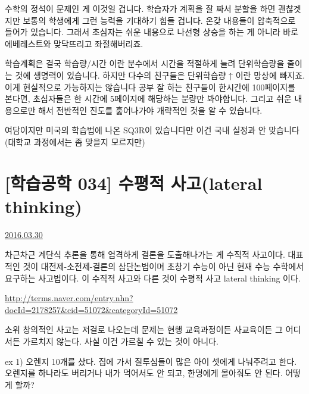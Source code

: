 수학의 정석이 문제인 게 이것일 겁니다.
학습자가 계획을 잘 짜서 분할을 하면 괜찮겟지만 보통의 학생에게 그런 능력을 기대하기 힘들 겁니다.
온갖 내용들이 압축적으로 들어가 있습니다. 그래서 초심자는 쉬운 내용으로 나선형 상승을 하는 게 아니라
바로 에베레스트와 맞닥뜨리고 좌절해버리죠.
\vspace{5mm}

학습계획은 결국 학습량/시간 이란 분수에서 시간을 적절하게 늘려 단위학습량을 줄이는 것에 생명력이 있습니다.
하지만 다수의 친구들은 단위학습량 ↑ 이란 망상에 빠지죠. 이게 현실적으로 가능하지는 않습니다
공부 잘 하는 친구들이 한시간에 100페이지를 본다면, 초심자들은 한 시간에 5페이지에 해당하는 분량만 봐야합니다.
그리고 쉬운 내용으로만 해서 전반적인 진도를 훑어나가야 개략적인 것을 알 수 있습니다.
\vspace{5mm}

여담이지만 미국의 학습법에 나온 SQ3R이 있습니다만 이건 국내 실정과 안 맞습니다(대학교 과정에서는 좀 맞을지 모르지만)
\vspace{5mm}











\section{[학습공학 034] 수평적 사고(lateral thinking)}
\href{https://www.kockoc.com/Apoc/702963}{2016.03.30}

\vspace{5mm}

차근차근 계단식 추론을 통해 엄격하게 결론을 도출해나가는 게 수직적 사고이다.
대표적인 것이 대전제-소전제-결론의 삼단논법이며 초창기 수능이 아닌 현재 수능 수학에서 요구하는 사고법이다.
이 수직적 사고와 다른 것이 수평적 사고 lateral thinking 이다.
\vspace{5mm}

\url{http://terms.naver.com/entry.nhn?docId=2178257&cid=51072&categoryId=51072}
\vspace{5mm}

소위 창의적인 사고는 저걸로 나오는데 문제는 현행 교육과정이든 사교육이든 그 어디서든 가르치지 않는다.
사실 이건 가르칠 수 있는 것이 아니다.
\vspace{5mm}

ex 1) 오렌지 10개를 샀다. 집에 가서 질투심들이 많은 아이 셋에게 나눠주려고 한다.
오렌지를 하나라도 버리거나 내가 먹어서도 안 되고, 한명에게 몰아줘도 안 된다. 어떻게 할까?
\vspace{5mm}

